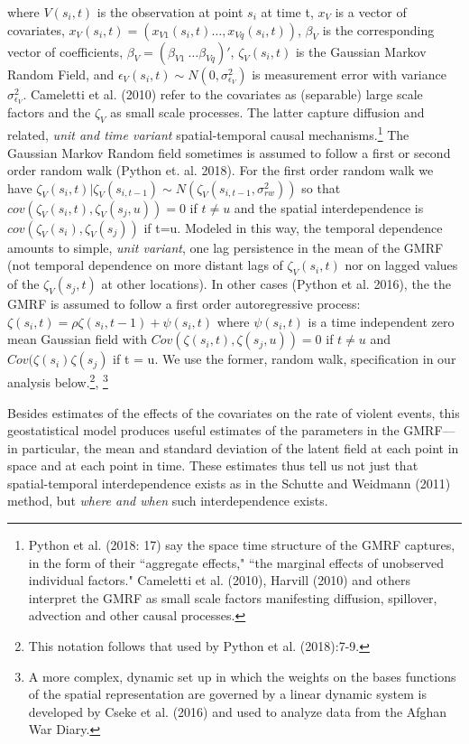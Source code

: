 \documentclass[12pt]{article}
\begin{document}
where $V(s_i,t)$ is the observation at point $s_i$ at time t, $x_V$ is a vector of
covariates, $x_V(s_i,t)=(x_{V1}(s_i,t) \ldots, x_{Vq}(s_i,t))$, $\beta_V$ is the corresponding
vector of coefficients, $\beta_V = (\beta_{V1}\ \ldots \beta_{Vq})'$, $\zeta_V(s_i,t)$ is the Gaussian
Markov Random Field, and $\epsilon_{V}(s_i,t) \sim N(0,\sigma_{\epsilon_{V}}^2)$ is measurement error
with variance $\sigma_{\epsilon_V}^2$. Cameletti et al. (2010) refer to the covariates as (separable) large scale
factors and the $\zeta_V$ as small scale processes. The latter capture diffusion and related, \textit
{unit and time variant} spatial-temporal causal mechanisms.\footnote{Python et al. (2018: 17) say
the space time structure of the GMRF captures, in the form of their ``aggregate effects,"
``the marginal effects of unobserved individual factors."
Cameletti et al. (2010), Harvill (2010) and others interpret the GMRF as small scale factors
manifesting diffusion, spillover, advection and other causal processes.}
The Gaussian Markov Random field
sometimes is assumed to follow a first or second order random walk (Python et. al. 2018). For the first order random walk
we have $\zeta_{V}(s_i,t)|\zeta_{V}(s_{i,t-1}) \sim N(\zeta_{V}(s_{i,t-1},\sigma_{rw}^2))$ so
that $cov(\zeta_{V}(s_i,t),\zeta_{V}(s_j,u)) = 0$ if $t\ne u$ and the spatial interdependence is
$cov(\zeta_{V}(s_i),\zeta_{V}(s_j))$ if t=u. Modeled in this way, the temporal dependence amounts
to simple, \emph{unit variant}, one lag persistence in the mean of the GMRF (not temporal dependence on more distant
lags of $\zeta_V(s_i,t)$ nor on lagged values of the $\zeta_V(s_j,t)$ at other locations).
In other cases (Python et al. 2016), the the GMRF is assumed to follow a first order autoregressive
process: $\zeta(s_i,t) = \rho \zeta(s_i,t-1) + \psi(s_i,t)$ where $\psi(s_i,t)$ is a time independent
zero mean Gaussian field with $Cov(\zeta(s_i,t),\zeta(s_j,u)) = 0$ if $t \ne u$ and $Cov(\zeta(s_i)\zeta(s_j)$
if t = u. We use the former, random walk, specification in our analysis below.\footnote{This notation follows
that used by Python et al. (2018):7-9.}, \footnote{A more complex, dynamic set up in which the
weights on the bases functions of the spatial representation are governed by a linear
dynamic system is developed by Cseke et al. (2016) and used to analyze data from the Afghan
War Diary.}

Besides estimates of the effects of the covariates on the rate of violent events, this geostatistical
model produces useful estimates of the parameters in the GMRF---in particular, the mean and
standard deviation of the latent field at each point in space and at each point in time.
These estimates thus tell us not just that spatial-temporal interdependence exists as
in the Schutte and Weidmann (2011) method, but \emph{where and when} such interdependence
exists.
\end{document}
